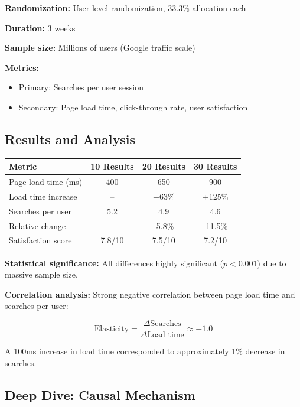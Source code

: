 \textbf{Randomization:} User-level randomization, 33.3\% allocation each

\textbf{Duration:} 3 weeks

\textbf{Sample size:} Millions of users (Google traffic scale)

\textbf{Metrics:}
\begin{itemize}
    \item Primary: Searches per user session
    \item Secondary: Page load time, click-through rate, user satisfaction
\end{itemize}

\subsection{Results and Analysis}

\begin{center}
\begin{tabular}{lccc}
\toprule
\textbf{Metric} & \textbf{10 Results} & \textbf{20 Results} & \textbf{30 Results} \\
\midrule
Page load time (ms) & 400 & 650 & 900 \\
Load time increase & -- & +63\% & +125\% \\
Searches per user & 5.2 & 4.9 & 4.6 \\
Relative change & -- & -5.8\% & -11.5\% \\
Satisfaction score & 7.8/10 & 7.5/10 & 7.2/10 \\
\bottomrule
\end{tabular}
\end{center}

\textbf{Statistical significance:} All differences highly significant ($p < 0.001$) due to massive sample size.

\textbf{Correlation analysis:} Strong negative correlation between page load time and searches per user:

\begin{equation}
\text{Elasticity} = \frac{\Delta \text{Searches}}{\Delta \text{Load time}} \approx -1.0
\end{equation}

A 100ms increase in load time corresponded to approximately 1\% decrease in searches.

\subsection{Deep Dive: Causal Mechanism}

